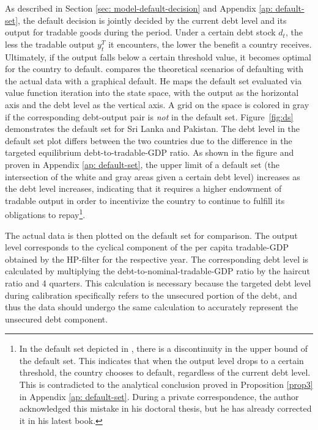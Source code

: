 As described in Section \ref{sec: model-default-decision} and Appendix \ref{ap: default-set}, the default decision is jointly decided by the current debt level and its output for tradable goods during the period. Under a certain debt stock $d_t$, the less the tradable output $y^T_t$ it encounters, the lower the benefit a country receives.
Ultimately, if the output falls below a certain threshold value, it becomes optimal for the country to default.
\citet{Hinrichsen_2020-chapter4} compares the theoretical scenarios of defaulting with the actual data with a graphical default. He maps the default set evaluated via value function iteration into the state space, with the output as the horizontal axis and the debt level as the vertical axis. A grid on the space is colored in gray if the corresponding debt-output pair is \emph{not} in the default set. Figure~\ref{fig:ds} demonstrates the default set for Sri Lanka and Pakistan. The debt level in the default set plot differs between the two countries due to the difference in the targeted equilibrium debt-to-tradable-GDP ratio. As shown in the figure and proven in Appendix \ref{ap: default-set}, the upper limit of a default set (the intersection of the white and gray areas given a certain debt level) increases as the debt level increases, indicating that it requires a higher endowment of tradable output in order to incentivize the country to continue to fulfill its obligations to repay\footnote{
    In the default set depicted in \citet{Hinrichsen_2020-chapter4}, there is a discontinuity in the upper bound of the default set. This indicates that when the output level drops to a certain threshold, the country chooses to default, regardless of the current debt level. This is contradicted to the analytical conclusion proved in Proposition \ref{prop3} in Appendix \ref{ap: default-set}. During a private correspondence, the author acknowledged this mistake in his doctoral thesis, but he has already corrected it in his latest book.
}.

The actual data is then plotted on the default set for comparison. The output level corresponds to the cyclical component of the per capita tradable-GDP obtained by the HP-filter for the respective year.
The corresponding debt level is calculated by multiplying the debt-to-nominal-tradable-GDP ratio by the haircut ratio and 4 quarters. This calculation is necessary because the targeted debt level during calibration specifically refers to the unsecured portion of the debt, and thus the data should undergo the same calculation to accurately represent the unsecured debt component.

